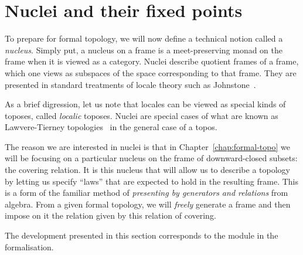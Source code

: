\section{Nuclei and their fixed points}\label{sec:nuclei}

To prepare for formal topology, we will now define a technical notion called a
\emph{nucleus}. Simply put, a nucleus on a frame is a meet-preserving monad on the frame
when it is viewed as a category. Nuclei describe quotient frames of a frame, which one
views as subspaces of the space corresponding to that frame. They are presented in
standard treatments of locale theory such as Johnstone~\cite[Sec.~II.2]{stone-spaces}.

As a brief digression, let us note that locales can be viewed as special kinds of toposes,
called \emph{localic} toposes. Nuclei are special cases of what are known as
Lawvere-Tierney topologies~\cite{quantifiers-and-sheaves, nlab-nucleus} in the general
case of a topos.

The reason we are interested in nuclei is that in Chapter~\ref{chap:formal-topo} we will
be focusing on a particular nucleus on the frame of downward-closed subsets: the covering
relation. It is this nucleus that will allow us to describe a topology by letting us
specify ``laws'' that are expected to hold in the resulting frame. This is a form of the
familiar method of \emph{presenting by generators and relations} from algebra. From a
given formal topology, we will \emph{freely} generate a frame and then impose on it the
relation given by this relation of covering.

The development presented in this section corresponds to the  module
in the \veragda{} formalisation.

